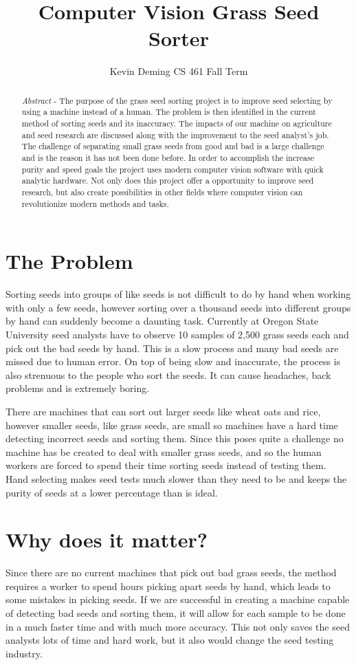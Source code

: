 \documentclass[10pt, letterpaper, twoside, draftclsnofoot, onecolumn. notitlepage]{article}
\title{Computer Vision Grass Seed Sorter}
\author{Kevin Deming
CS 461 Fall Term}
\begin{document}
	
	\begin{titlepage}
		\maketitle
		\begin{abstract}
			\textit{Abstract} - The purpose of the grass seed sorting project is to improve seed selecting by using a machine instead of a human. The problem is then identified in the current method of sorting seeds and its inaccuracy. The impacts of our machine on agriculture and seed research are discussed along with the improvement to the seed analyst's job. The challenge of separating small grass seeds from good and bad is a large challenge and is the reason it has not been done before. In order to accomplish the increase purity and speed goals the project uses modern computer vision software with quick analytic hardware. Not only does this project offer a opportunity to improve seed research, but also create possibilities in other fields where computer vision can revolutionize modern methods and tasks.
		\end{abstract}
	\end{titlepage}
\section{The Problem}
\quad Sorting seeds into groups of like seeds is not difficult to do by hand when working with only a few seeds, however sorting over a thousand seeds into different groups by hand can suddenly become a daunting task. Currently at Oregon State University seed analysts have to observe 10 samples of 2,500 grass seeds each and pick out the bad seeds by hand. This is a slow process and many bad seeds are missed due to human error. On top of being slow and inaccurate, the process is also strenuous to the people who sort the seeds. It can cause headaches, back problems and is extremely boring.

There are machines that can sort out larger seeds like wheat oats and rice, however smaller seeds, like grass seeds, are small so machines have a hard time detecting incorrect seeds and sorting them. Since this poses quite a challenge no machine has be created to deal with smaller grass seeds, and so the human workers are forced to spend their time sorting seeds instead of testing them. Hand selecting makes seed tests much slower than they need to be and keeps the purity of seeds at a lower percentage than is ideal.


\section{Why does it matter?}
\quad Since there are no current machines that pick out bad grass seeds, the method requires a worker to spend hours picking apart seeds by hand, which leads to some mistakes in picking seeds. If we are successful in creating a machine capable of detecting bad seeds and sorting them, it will allow for each sample to be done in a much faster time and with much more accuracy. This not only saves the seed analysts lots of time and hard work, but it also would change the seed testing industry. 
\end{document}
